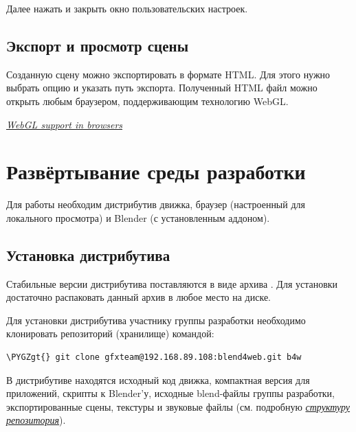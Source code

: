 \documentclass[a4paper,12pt,oneside]{sphinxmanual}
\def\PYGZgt{\char`\>}
\begin{document}
Далее нажать  и закрыть окно пользовательских настроек.


\section{Экспорт и просмотр сцены}
\label{first_steps:first-step-export-view}\label{first_steps:id5}\label{first_steps:index-1}
Созданную сцену можно экспортировать в формате HTML. Для этого нужно выбрать опцию  и указать путь экспорта. Полученный HTML файл можно открыть любым браузером, поддерживающим технологию WebGL.




{\hyperref[about:browser-webgl-support]{\emph{WebGL support in browsers}}}




\chapter{Развёртывание среды разработки}
\label{setup:setup}\label{setup::doc}\label{setup:index-2}\label{setup:id1}
Для работы необходим дистрибутив движка, браузер (настроенный для локального
просмотра) и Blender (с установленным аддоном).


\section{Установка дистрибутива}
\label{setup:getting-started-distribution}\label{setup:id2}
Стабильные версии дистрибутива поставляются в виде архива .
Для установки достаточно распаковать данный архив в любое место на диске.

Для установки дистрибутива участнику группы разработки необходимо клонировать
репозиторий (хранилище) командой:

\begin{Verbatim}[commandchars=\\\{\}]
\PYGZgt{} git clone gfxteam@192.168.89.108:blend4web.git b4w
\end{Verbatim}

В дистрибутиве находятся исходный код движка, компактная версия для приложений,
скрипты к Blender'у, исходные blend-файлы группы разработки, экспортированные
сцены, текстуры и звуковые файлы (см. подробную {\hyperref[developers:repo-file-structure]{\emph{структуру репозитория}}}).
\end{document}
